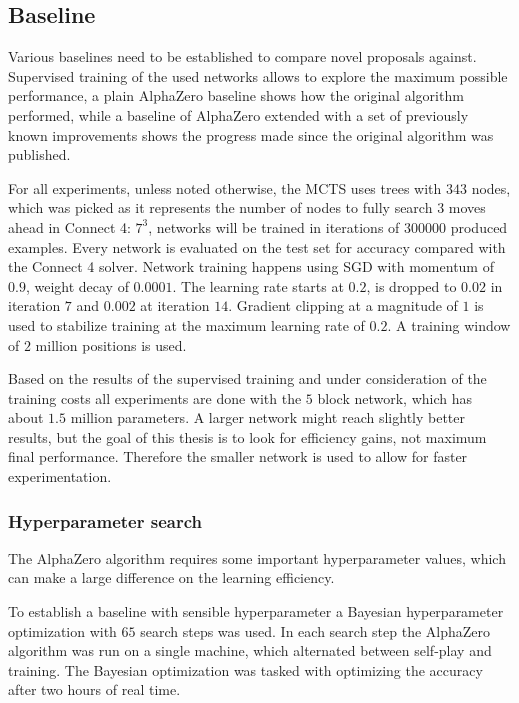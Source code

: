 \documentclass[12pt,onecolumn,oneside,titlepage]{article}
\begin{document}
\subsection{Baseline}

Various baselines need to be established to compare novel proposals against. Supervised training of the used networks allows to explore the maximum possible performance, a plain AlphaZero baseline shows how the original algorithm performed, while a baseline
of AlphaZero extended with a set of previously known improvements shows the progress made since the original algorithm was published.

For all experiments, unless noted otherwise, the MCTS uses trees with $343$ nodes, which was picked as it represents the number of nodes to fully search $3$ moves ahead in Connect 4: $7^3$,
networks will be trained in iterations of $300000$ produced examples. Every network is evaluated on the test set for accuracy compared with the Connect 4 solver.
Network training happens using SGD with momentum of $0.9$, weight decay of $0.0001$. The learning rate starts at $0.2$, is dropped to $0.02$ in iteration $7$ and $0.002$ at iteration $14$. 
Gradient clipping at a magnitude of $1$ is used to stabilize training at the maximum learning rate of $0.2$.
A training window of $2$ million positions is used.


Based on the results of the supervised training and under consideration of the training costs all experiments are done with the $5$ block network, which has about $1.5$ million parameters. A larger network might reach slightly better results,
but the goal of this thesis is to look for efficiency gains, not maximum final performance. Therefore the smaller network is used to allow for faster experimentation.

\subsubsection{Hyperparameter search}

The AlphaZero algorithm requires some important hyperparameter values, which can make a large difference on the learning efficiency. 

To establish a baseline with sensible hyperparameter a Bayesian hyperparameter optimization with $65$ search steps was used.
In each search step the AlphaZero algorithm was run on a single machine, which alternated between self-play and training. The Bayesian optimization was tasked with optimizing the accuracy after two hours of real time. 
\end{document}
